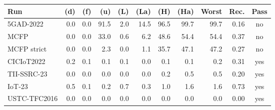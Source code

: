\begin{tabular}{lrrrrrrrrrc}
\toprule
Run & (d) & (f) & (u) & (L) & (La) & (H) & (Ha) & Worst & Rec. & Pass \\
\midrule
5GAD-2022 & 0.0 & 0.0 & 91.5 & 2.0 & 14.5 & 96.5 & 99.7 & 99.7 & 0.16 & no \\
MCFP & 0.0 & 0.0 & 33.0 & 0.6 & 6.2 & 48.6 & 54.4 & 54.4 & 0.37 & no \\
MCFP strict & 0.0 & 0.0 & 2.3 & 0.0 & 1.1 & 35.7 & 47.1 & 47.2 & 0.27 & no \\
CICIoT2022 & 0.2 & 0.1 & 0.1 & 0.1 & 0.0 & 0.1 & 0.1 & 0.2 & 0.31 & yes \\
TII-SSRC-23 & 0.0 & 0.0 & 0.0 & 0.0 & 0.0 & 0.2 & 0.5 & 0.5 & 0.20 & yes \\
IoT-23 & 0.5 & 0.1 & 0.2 & 0.7 & 0.3 & 1.0 & 1.6 & 1.6 & 0.73 & yes \\
USTC-TFC2016 & 0.0 & 0.0 & 0.0 & 0.0 & 0.0 & 0.0 & 0.0 & 0.0 & 0.00 & yes \\
\bottomrule
\end{tabular}
